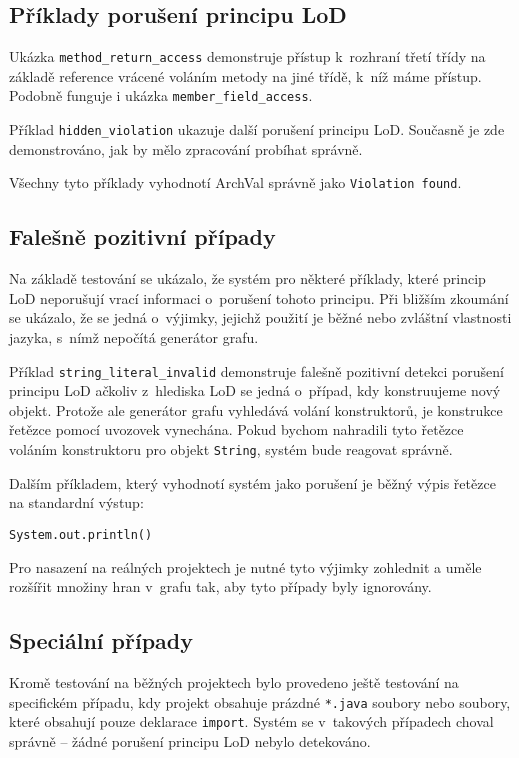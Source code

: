 \subsection{Příklady porušení principu LoD}

Ukázka \verb+method_return_access+ demonstruje přístup k~rozhraní třetí třídy na základě reference vrácené voláním metody na jiné třídě, k~níž máme přístup. Podobně funguje i ukázka \verb+member_field_access+.

Příklad \verb+hidden_violation+ ukazuje další porušení principu LoD. Současně je zde demonstrováno, jak by mělo zpracování probíhat správně.

Všechny tyto příklady vyhodnotí ArchVal správně jako \verb+Violation found+.

\subsection{Falešně pozitivní případy}

Na základě testování se ukázalo, že systém pro některé příklady, které princip LoD neporušují vrací informaci o~porušení tohoto principu. Při bližším zkoumání se ukázalo, že se jedná o~výjimky, jejichž použití je běžné nebo zvláštní vlastnosti jazyka, s~nímž nepočítá generátor grafu.

Příklad \verb+string_literal_invalid+ demonstruje falešně pozitivní detekci porušení principu LoD ačkoliv z~hlediska LoD se jedná o~případ, kdy konstruujeme nový objekt. Protože ale generátor grafu vyhledává volání konstruktorů, je konstrukce řetězce pomocí uvozovek vynechána. Pokud bychom nahradili tyto řetězce voláním konstruktoru pro objekt \verb+String+, systém bude reagovat správně.

Dalším příkladem, který vyhodnotí systém jako porušení je běžný výpis řetězce na standardní výstup:

\begin{verbatim}
System.out.println()
\end{verbatim}

Pro nasazení na reálných projektech je nutné tyto výjimky zohlednit a uměle rozšířit množiny hran v~grafu tak, aby tyto případy byly ignorovány.

\subsection{Speciální případy}

Kromě testování na běžných projektech bylo provedeno ještě testování na specifickém případu, kdy projekt obsahuje prázdné \verb+*.java+ soubory nebo soubory, které obsahují pouze deklarace \verb+import+. Systém se v~takových případech choval správně -- žádné porušení principu LoD nebylo detekováno.
